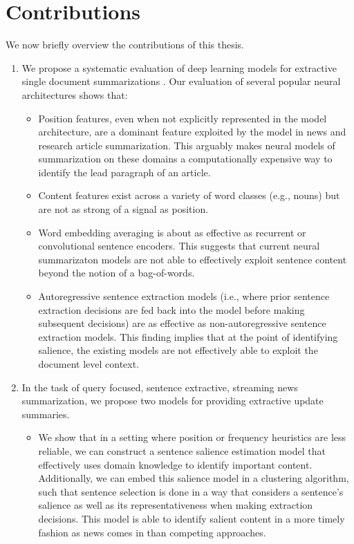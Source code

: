 \section{Contributions}
  
We now briefly overview the contributions of this thesis.
  
\begin{enumerate}
  \item We propose a systematic evaluation of deep learning models for
extractive single document summarizations \citep{kedzie2018}.  Our evaluation
of several popular neural architectures shows that:
  \begin{itemize}
    \item Position features, even when not explicitly represented in the model
architecture, are a dominant feature exploited by the model in news and
research article summarization. This arguably makes neural models of
summarization on these domains a computationally expensive way to identify the
lead paragraph of an article.
    \item Content features exist across a variety of word classes (e.g., nouns)
but are not as strong of a signal as position.
    \item Word embedding averaging is about as effective as recurrent or
convolutional sentence encoders. This suggests that current neural summarizaton
models are not able to effectively exploit sentence content beyond the notion
of a bag-of-words.
    \item Autoregressive sentence extraction models (i.e., where prior sentence
extraction decisions are fed back into the model before making subsequent
decisions) are as effective as non-autoregressive sentence extraction models.
This finding implies that at the point of identifying salience, the existing
models are not effectively able to exploit the document level context. 
  \end{itemize}
  \item In the task of query focused, sentence extractive, streaming news
summarization, we propose two models for providing extractive update summaries.
\citep{kedzie2015,kedzie2016}
  \begin{itemize}
    \item We show that in a setting where position or frequency heuristics are
less reliable, we can construct a sentence salience estimation model that
effectively uses domain knowledge to identify important content. Additionally,
we can embed this salience model in a clustering algorithm, such that sentence
selection is done in a way that considers a sentence's salience as well as its
representativeness when making extraction decisions. This model is able to
identify salient content in a more timely fashion as news comes in than
competing approaches.


\end{itemize}
\end{enumerate}
